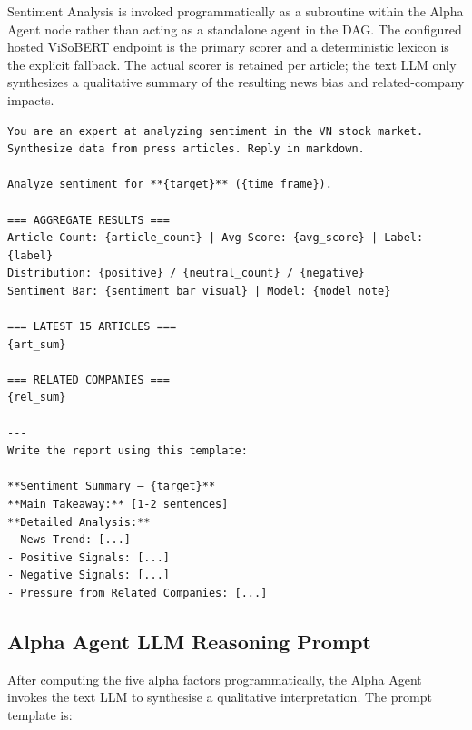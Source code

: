 Sentiment Analysis is invoked programmatically as a subroutine within the Alpha Agent node rather than acting as a standalone agent in the DAG. The configured hosted ViSoBERT endpoint is the primary scorer and a deterministic lexicon is the explicit fallback. The actual scorer is retained per article; the text LLM only synthesizes a qualitative summary of the resulting news bias and related-company impacts.

\begin{framed}
\begin{small}
\begin{verbatim}
You are an expert at analyzing sentiment in the VN stock market.
Synthesize data from press articles. Reply in markdown.

Analyze sentiment for **{target}** ({time_frame}).

=== AGGREGATE RESULTS ===
Article Count: {article_count} | Avg Score: {avg_score} | Label: {label}
Distribution: {positive} / {neutral_count} / {negative}
Sentiment Bar: {sentiment_bar_visual} | Model: {model_note}

=== LATEST 15 ARTICLES ===
{art_sum}

=== RELATED COMPANIES ===
{rel_sum}

---
Write the report using this template:

**Sentiment Summary — {target}**
**Main Takeaway:** [1-2 sentences]
**Detailed Analysis:**
- News Trend: [...]
- Positive Signals: [...]
- Negative Signals: [...]
- Pressure from Related Companies: [...]
\end{verbatim}
\end{small}
\end{framed}

\subsection{Alpha Agent LLM Reasoning Prompt}
\label{app:prompt_alpha}

After computing the five alpha factors programmatically, the Alpha Agent invokes the text LLM to synthesise a qualitative interpretation. The prompt template is:

